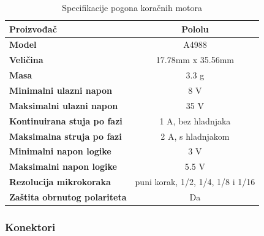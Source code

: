 \documentclass[11pt,a4paper]{article}
\begin{document}
\begin{table}[H]
	\centering
	\caption{Specifikacije pogona koračnih motora}
	\label{tab:specifikacija_stepper_driver}
	\begin{tabular}{|l|c|}
		\hline
		\textbf{Proizvođač} & Pololu \\ \hline 
		\textbf{Model} & A4988 \\ \hline 
		\textbf{Veličina} &  17.78mm x 35.56mm  \\ \hline 
		\textbf{Masa} & 3.3 g \\ \hline 
		\textbf{Minimalni ulazni napon} & 8 V \\ \hline 
		\textbf{Maksimalni ulazni napon} & 35 V \\ \hline 
		\textbf{Kontinuirana stuja po fazi} & 1 A, bez hladnjaka \\ \hline 
		\textbf{Maksimalna struja po fazi} & 2 A, s hladnjakom \\ \hline 
		\textbf{Minimalni napon logike} & 3 V\\ \hline 
		\textbf{Maksimalni napon logike} & 5.5 V\\ \hline 
		\textbf{Rezolucija mikrokoraka} & puni korak, 1/2, 1/4, 1/8 i 1/16\\ \hline 
		\textbf{Zaštita obrnutog polariteta} & Da\\ \hline 
	\end{tabular}
\end{table}


\subsubsection{Konektori}
\end{document}
